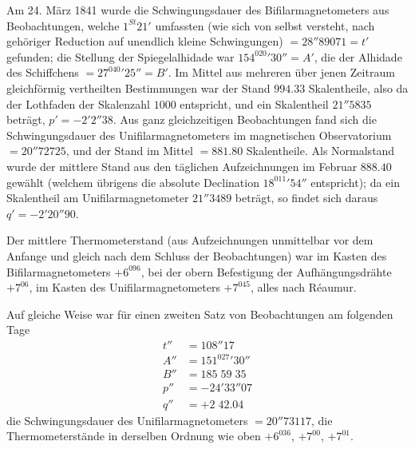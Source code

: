 Am 24. März 1841 wurde die Schwingungsdauer des Bifilarmagnetometers aus Beobachtungen, welche $1^{St}21'$ umfassten (wie sich von selbst versteht, nach gehöriger Reduction auf unendlich kleine Schwingungen) $=28''89071=t'$ gefunden; die Stellung der Spiegelalhidade war $154^020'30''=A'$, die der Alhidade des Schiffchens $=27^040'25''=B'$. Im Mittel aus mehreren über jenen Zeitraum gleichförmig vertheilten Bestimmungen war der Stand $994.33$ Skalentheile, also da der Lothfaden der Skalenzahl $1000$ entspricht, und ein Skalentheil $21''5835$ beträgt, $p'=-2'2''38$. Aus ganz gleichzeitigen Beobachtungen fand sich die Schwingungsdauer des Unifilarmagnetometers im magnetischen
Observatorium $=20''72725$, und der Stand im Mittel $=881.80$ Skalentheile. Als Normalstand wurde der mittlere Stand aus den täglichen Aufzeichnungen im Februar $888.40$ gewählt (welchem übrigens die absolute Declination $18^011'54''$ entspricht); da ein Skalentheil am Unifilarmagnetometer $21''3489$ beträgt, so findet sich daraus $q'=-2'20''90$.

Der mittlere Thermometerstand (aus Aufzeichnungen unmittelbar vor dem Anfange und gleich nach dem Schluss der Beobachtungen) war im Kasten des Bifilarmagnetometers $+6^096$, bei der obern Befestigung der Aufhängungsdrähte $+7^06$, im Kasten des Unifilarmagnetometers $+7^045$, alles nach Réaumur.

Auf gleiche Weise war für einen zweiten Satz von Beobachtungen am folgenden Tage
\[
\begin{aligned}
t''&=108''17\\
A''&=151^027'30''\\
B''&=185\;59\;35\\
p''&=-24'33''07\\
q''&=+2\;42.04
\end{aligned}
\]
die Schwingungsdauer des Unifilarmagnetometers $=20''73117$, die Thermometerstände in derselben Ordnung wie oben $+6^036$, $+7^00$, $+7^01$.

